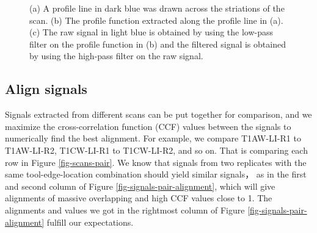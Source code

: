 \documentclass[fleqn,10pt]{wlscirep}
\begin{document}
\begin{figure}
\begin{minipage}{0.50\linewidth}
{}

\subcaption{\label{fig-T1AW-LI-R1-signals-plot}}

\end{minipage}%

\caption{\label{fig-T1AW-LI-R1-profiles-signals}(a) A profile line in
dark blue was drawn across the striations of the scan. (b) The profile
function extracted along the profile line in (a). (c) The raw signal in
light blue is obtained by using the low-pass filter on the profile
function in (b) and the filtered signal is obtained by using the
high-pass filter on the raw signal.}

\end{figure}%

\subsection*{Align signals}\label{sec-align-signals}

Signals extracted from different scans can be put together for
comparison, and we maximize the cross-correlation function (CCF) values
between the signals to numerically find the best alignment. For example,
we compare T1AW-LI-R1 to T1AW-LI-R2, T1CW-LI-R1 to T1CW-LI-R2, and so
on. That is comparing each row in Figure \ref{fig-scans-pair}. We know
that signals from two replicates with the same tool-edge-location
combination should yield similar signals， as in the first and second
column of Figure \ref{fig-signals-pair-alignment}, which will give
alignments of massive overlapping and high CCF values close to 1. The
alignments and values we got in the rightmost column of Figure
\ref{fig-signals-pair-alignment} fulfill our expectations.
\end{document}
